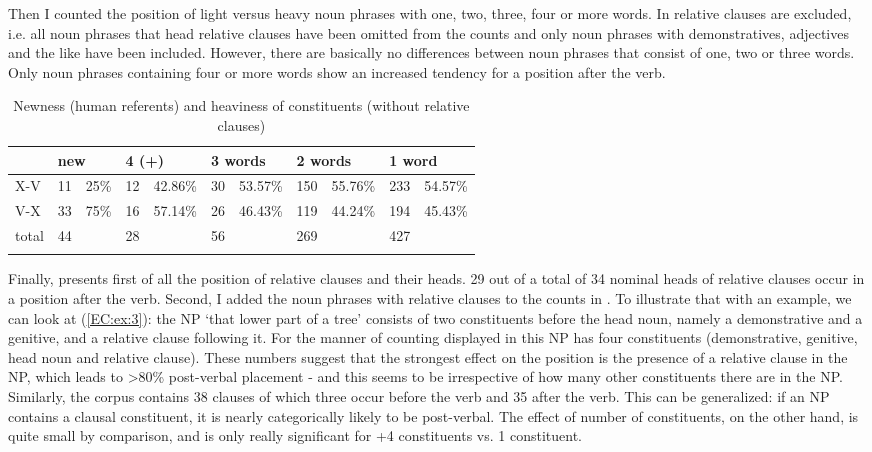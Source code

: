 \documentclass[output=paper,colorlinks,citecolor=brown,draftmode]{langscibook}
\begin{document}
Then I counted the position of light versus heavy noun phrases with one, two, three, four or more words. In  relative clauses are excluded, i.e. all noun phrases that head relative clauses have been omitted from the counts and only noun phrases with demonstratives, adjectives and the like have been included. However, there are basically no differences between noun phrases that consist of one, two or three words. Only noun phrases containing four or more words show an increased tendency for a position after the verb.

\begin{table}
 \begin{tabularx}{\textwidth}{Xrrrrrrrrrr}
\lsptoprule
 & \multicolumn{2}{l}{new} & \multicolumn{2}{l}{4 (+)} words & \multicolumn{2}{l}{3 words} & \multicolumn{2}{l}{2 words} & \multicolumn{2}{l}{1 word} \\
\midrule
X-V & 11 & 25\% & 12 & 42.86\% & 30 & 53.57\% & 150 & 55.76\% & 233 & 54.57\% \\
V-X & 33 & \cellcolor{gray!50}75\% & 16 & 57.14\% & 26 & 46.43\% & 119 & 44.24\% & 194 & 45.43\% \\
\midrule
total  & 44 & & 28 & & 56 & & 269 & & 427 & \\
 \lspbottomrule
 \end{tabularx}
 \caption{Newness (human referents) and heaviness of constituents (without relative clauses)}
 \label{EC:tab:4}
\end{table}

Finally,  presents first of all the position of relative clauses and their heads. 29 out of a total of 34 nominal heads of relative clauses occur in a position after the verb. Second, I added the noun phrases with relative clauses to the counts in . To illustrate that with an example, we can look at (\ref{EC:ex:3}): the NP `that lower part of a tree' consists of two constituents before the head noun, namely a demonstrative and a genitive, and a relative clause following it. For the manner of counting displayed in  this NP has four constituents (demonstrative, genitive, head noun and relative clause). These numbers suggest that the strongest effect on the position is the presence of a relative clause in the NP, which leads to >80\% post-verbal placement - and this seems to be irrespective of how many other constituents there are in the NP. Similarly, the corpus contains 38  clauses of which three occur before the verb and 35 after the verb. This can be generalized: if an NP contains a clausal constituent, it is nearly categorically likely to be post-verbal. The effect of number of constituents, on the other hand, is quite small by comparison, and is only really significant for +4 constituents vs. 1 constituent.
\end{document}
